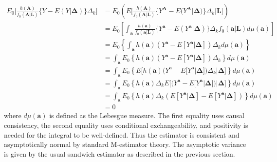 \documentclass[12pt]{article}
\begin{document}
\begin{align*}
E_{0} \bigg[\frac{h(\bm{A})}{f_{0}(\bm{A} | \bm{L})} \{ Y - E(Y | \bm{\Delta})\} \Delta_{k} \bigg] &= E_{0} \left( E \bigg[\frac{h(\bm{A})}{f_{0}(\bm{A} | \bm{L})} \{ Y^{\bm{A}} - E(Y^{\bm{A}} | \bm{\Delta}) \} \Delta_{k} | \bm{L} \bigg] \right) \\
&= E_{0} \left [ \int_{\bm{a}} \frac{h(\bm{a})}{f_{0}(\bm{a} | \bm{L})}\{ Y^{\bm{a}} - E(Y^{\bm{a}} | \bm{\Delta}) \} \Delta_{k} f_{0}(\bm{a} | \bm{L}) d\mu (\bm{a}) \right ] \\
&= E_{0} \left \{ \int_{\bm{a}} h(\bm{a})(Y^{\bm{a}} - E[Y^{\bm{a}} | \bm{\Delta}])\Delta_{k} d\mu (\bm{a}) \right \} \\
&= \int_{\bm{a}} E_{0} \left \{ h(\bm{a})(Y^{\bm{a}} - E[Y^{\bm{a}} | \bm{\Delta}])\Delta_{k} \right \} d\mu (\bm{a}) \\
&= \int_{\bm{a}} E_{0} \left \{ E \bigg[ h(\bm{a})(Y^{\bm{a}} - E[Y^{\bm{a}} | \bm{\Delta}])\Delta_{k} | \bm{\Delta} \bigg] \right \} d\mu (\bm{a}) \\
&= \int_{\bm{a}} E_{0} \left \{ h(\bm{a})\Delta_{k} E \bigg[ (Y^{\bm{a}} - E[Y^{\bm{a}} | \bm{\Delta}]) | \bm{\Delta} \bigg] \right \} d\mu (\bm{a}) \\
&= \int_{\bm{a}} E_{0} \left \{ h(\bm{a})\Delta_{k} ( E[Y^{\bm{a}} | \bm{\Delta}] - E[Y^{\bm{a}} | \bm{\Delta}] ) \right \} d\mu (\bm{a}) \\
&= 0
\end{align*}
where $d\mu (\bm{a})$ is defined as the Lebesgue measure. The first equality uses causal consistency, the second equality uses conditional exchangeability, and positivity is needed for the integral to be well-defined. Thus the estimator is consistent and asymptotically normal by standard M-estimator theory. The asymptotic variance is given by the usual sandwich estimator as described in the previous section.
\end{document}
